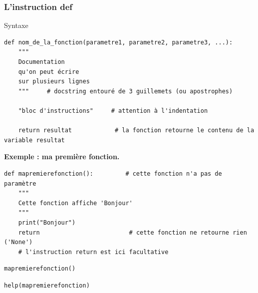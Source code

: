 \documentclass{beamer}
\begin{document}
\begin{frame}
\frametitle{L'instruction def}

\begin{block}{Syntaxe }

\begin{verbatim}
def nom_de_la_fonction(parametre1, parametre2, parametre3, ...):
    """
    Documentation
    qu'on peut écrire
    sur plusieurs lignes
    """     # docstring entouré de 3 guillemets (ou apostrophes)

    "bloc d'instructions"     # attention à l'indentation

    return resultat            # la fonction retourne le contenu de la variable resultat
\end{verbatim}
\end{block}
\end{frame}

\begin{frame}

\noindent\textbf{Exemple : ma première fonction.}
\begin{verbatim}
def mapremierefonction():         # cette fonction n'a pas de paramètre
    """
    Cette fonction affiche 'Bonjour'
    """
    print("Bonjour")
    return                         # cette fonction ne retourne rien ('None')
    # l'instruction return est ici facultative
\end{verbatim}

\begin{verbatim}
mapremierefonction()
\end{verbatim}

\begin{verbatim}
help(mapremierefonction)
\end{verbatim}
\end{frame}
\end{document}
